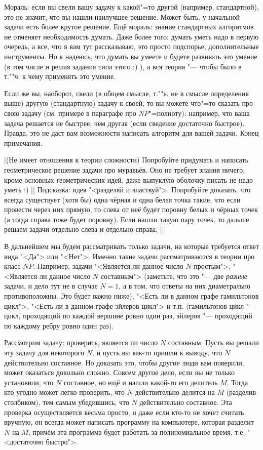 {{Мораль: если вы свели вашу задачу к какой"=то другой (например, стандартной), это не 
значит, что вы нашли наилучшее решение. Может быть, у начальной задачи есть 
более крутое решение. Ещё мораль: знание стандартных алгоритмов не 
отменяет необходимость думать. Даже более того: думать уметь надо в первую 
очередь, а все, что я вам тут рассказываю, это просто подспорье, дополнительные 
инструменты. Но я надеюсь, что думать вы умеете и будете развивать это умение 
(в том числе и решая задания типа этого :) ), а вся теория "--- чтобы было в 
т.""ч. к чему применять это умение.

Если же вы, наоборот, свели (в общем смысле, т.""е. не в смысле определения 
выше) другую (стандартную) задачу к своей, то вы можете  что"=то сказать про свою задачу (см. 
примере в параграфе про $NP$"=полноту): например, что ваша задача решается не 
быстрее, чем другая (если сведение достаточно быстрое). Правда, это не даст вам 
возможности написать алгоритм для вашей задачи. Конец примечания.}

\task|(Не имеет отношения к теории сложности) Попробуйте придумать и написать геометрическое решение задачи про муравьёв. Оно не требует знания 
ничего, кроме основных геометрических идей, даже выпуклую оболочку писать не 
надо уметь :)
||
Подсказка: идея "<разделяй и властвуй">. Попробуйте 
доказать, что всегда существует (хотя бы) одна чёрная и одна белая точка такие, что если 
провести через них прямую, то слева от неё будет поровну белых и чёрных точек 
(а тогда справа тоже будет поровну). Если нашли такую пару точек, то дальше 
решаем задачи отдельно слева и отдельно справа.
|||

 В дальнейшем мы будем 
рассматривать только задачи, на которые требуется ответ вида "<Да"> или 
"<Нет">. Именно такие задачи рассматриваются в теории про класс $NP$. Например, 
задачи "<Является ли данное число $N$ простым">, "<Является ли данное число $N$ 
составным"> (заметьте, что это "--- две \textit{разные} задачи, и дело тут не в 
случае $N=1$, а в том, что ответы на них 
диаметрально противоположны. Это будет важно ниже), "<Есть ли в данном графе 
гамильтонов цикл">, "<Есть ли в данном графе эйлеров цикл"> и т.п. (гамильтонов 
цикл "--- цикл, проходящий по каждой вершине ровно один раз, эйлеров "--- 
проходящий по каждому ребру ровно один раз).

 Рассмотрим задачу: проверить, является ли число $N$ составным. 
Пусть вы решали эту задачу для некоторого $N$, и пусть вы как-то пришли к 
выводу, что $N$ действительно составное. Но доказать это, чтобы другие люди вам 
поверили, может оказаться довольно сложно. Совсем другое дело, если вы не 
только установили, что $N$ составное, но ещё и нашли какой-то его делитель $M$. 
Тогда кто угодно может легко проверить, что $N$ действительно делится на $M$ 
(разделив столбиком), тем самым убедившись, что $N$ действительно составное. 
Эта проверка осуществляется весьма просто, и даже если кто-то не хочет считать 
вручную, он всегда может написать программу на компьютере, которая разделит $N$ 
на $M$, причём эта программа будет работать за полиномиальное время, т.е. 
"<достаточно быстро">.

}
